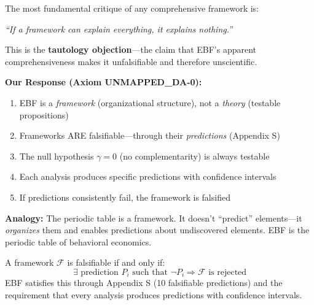 \begin{tcolorbox}[colback=red!5!white, colframe=red!75!black,
    title=The Tautology Problem]

The most fundamental critique of any comprehensive framework is:

\begin{center}
\textit{``If a framework can explain everything, it explains nothing.''}
\end{center}

This is the \textbf{tautology objection}---the claim that EBF's apparent
comprehensiveness makes it unfalsifiable and therefore unscientific.

\textbf{Our Response (Axiom UNMAPPED_DA-0):}
\begin{enumerate}[nosep]
    \item EBF is a \textit{framework} (organizational structure), not a \textit{theory} (testable propositions)
    \item Frameworks ARE falsifiable---through their \textit{predictions} (Appendix S)
    \item The null hypothesis $\gamma = 0$ (no complementarity) is always testable
    \item Each analysis produces specific predictions with confidence intervals
    \item If predictions consistently fail, the framework is falsified
\end{enumerate}

\textbf{Analogy:} The periodic table is a framework. It doesn't ``predict'' elements---it
\textit{organizes} them and enables predictions about undiscovered elements. EBF is
the periodic table of behavioral economics.

\end{tcolorbox}

\begin{axiom}
A framework $\mathcal{F}$ is falsifiable if and only if:
\begin{equation}
\exists \text{ prediction } P_i \text{ such that } \neg P_i \Rightarrow \mathcal{F} \text{ is rejected}
\end{equation}
EBF satisfies this through Appendix S (10 falsifiable predictions) and the requirement
that every analysis produces predictions with confidence intervals.
\end{axiom}

